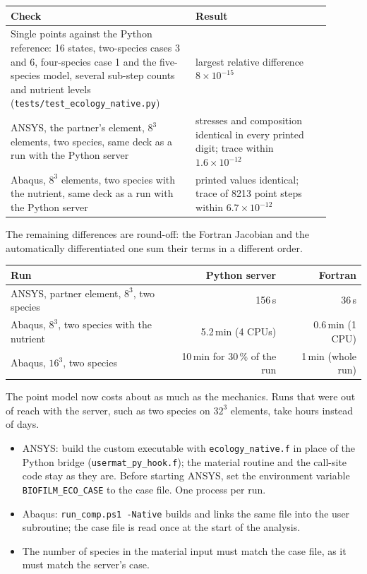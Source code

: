 \documentclass[11pt,a4paper]{article}
\newcommand{\sect}[1]{\par\vspace{6pt}{\color{c3}\large\bfseries #1}\par\vspace{2pt}}
\newcommand{\file}[1]{\texttt{\small #1}}
\begin{document}
\sect{Checks}
\begin{center}
\begin{tabular}{p{0.52\linewidth}p{0.38\linewidth}}
\toprule
Check & Result \\
\midrule
Single points against the Python reference: 16 states, two-species cases 3 and 6,
four-species case 1 and the five-species model, several sub-step counts and
nutrient levels (\file{tests/test\_ecology\_native.py}) & largest relative difference $8\times10^{-15}$ \\
ANSYS, the partner's element, $8^3$ elements, two species, same deck as a run
with the Python server & stresses and composition identical in every printed
digit; trace within $1.6\times10^{-12}$ \\
Abaqus, $8^3$ elements, two species with the nutrient, same deck as a run with
the Python server & printed values identical; trace of 8213 point steps within
$6.7\times10^{-12}$ \\
\bottomrule
\end{tabular}
\end{center}
The remaining differences are round-off: the Fortran Jacobian and the
automatically differentiated one sum their terms in a different order.

\sect{Speed}
\begin{center}
\begin{tabular}{lrr}
\toprule
Run & Python server & Fortran \\
\midrule
ANSYS, partner element, $8^3$, two species & 156\,s & 36\,s \\
Abaqus, $8^3$, two species with the nutrient & 5.2\,min (4 CPUs) & 0.6\,min (1 CPU) \\
Abaqus, $16^3$, two species & 10\,min for 30\,\% of the run & 1\,min (whole run) \\
\bottomrule
\end{tabular}
\end{center}
The point model now costs about as much as the mechanics. Runs that were out of
reach with the server, such as two species on $32^3$ elements, take hours
instead of days.

\sect{How to use it}
\begin{itemize}
\item ANSYS: build the custom executable with \file{ecology\_native.f} in place of
  the Python bridge (\file{usermat\_py\_hook.f}); the material routine and the
  call-site code stay as they are. Before starting ANSYS, set the environment
  variable \file{BIOFILM\_ECO\_CASE} to the case file. One process per run.
\item Abaqus: \file{run\_comp.ps1 -Native} builds and links the same file into the
  user subroutine; the case file is read once at the start of the analysis.
\item The number of species in the material input must match the case file, as
  it must match the server's case.
\end{itemize}
\end{document}
